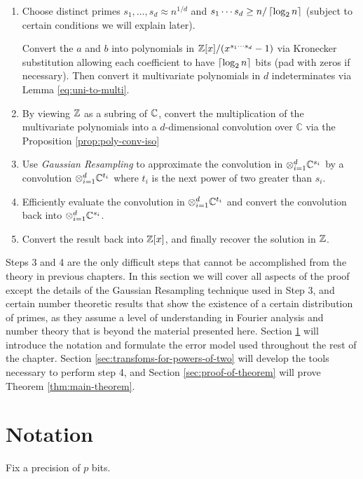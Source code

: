 \begin{enumerate}
    \item  Choose distinct primes $s_1, \ldots, s_d \approx n^{1/d}$ and $s_1\cdots s_d \ge n/\left \lceil \log_2 n \right \rceil$ (subject to certain conditions we will explain later).

        Convert the $a$ and $b$ into polynomials in ${\mathbb Z}[x]/(x^{s_1\cdots s_d} - 1)$ via Kronecker substitution allowing each coefficient to have $\left \lceil \log_2 n \right \rceil$ bits (pad with zeros if necessary). Then convert it multivariate polynomials in $d$ indeterminates via Lemma \ref{eq:uni-to-multi}.
    \item By viewing ${\mathbb Z}$ as a subring of ${\mathbb C}$, convert the multiplication of the multivariate polynomials into a $d$-dimensional convolution over $\mathbb{C}$ via the Proposition \ref{prop:poly-conv-iso}
    \item Use \emph{Gaussian Resampling} to approximate the convolution in $\otimes_{i=1}^d {\mathbb C}^{s_i}$ by a convolution $\otimes_{i=1}^d {\mathbb C}^{t_i}$ where $t_i$ is the next power of two greater than $s_i$.
    \item Efficiently evaluate the convolution in $\otimes_{i=1}^d {\mathbb C}^{t_i}$ and convert the convolution back into $\otimes_{i=1}^d {\mathbb C}^{s_i}$.
    \item Convert the result back into ${\mathbb Z}[x]$, and finally recover the solution in ${\mathbb Z}$.
\end{enumerate}

Steps 3 and 4 are the only difficult steps that cannot be accomplished from the theory in previous chapters. In this section we will cover all aspects of the proof except the details of the Gaussian Resampling technique used in Step 3, and certain number theoretic results that show the existence of a certain distribution of primes, as they assume a level of understanding in Fourier analysis and number theory that is beyond the material presented here. Section \ref{sec:notation} will introduce the notation and formulate the error model used throughout the rest of the chapter. Section \ref{sec:transfoms-for-powers-of-two} will develop the tools necessary to perform step 4, and Section \ref{sec:proof-of-theorem} will prove Theorem \ref{thm:main-theorem}.

\section{Notation}%
\label{sec:notation}

Fix a precision of $p$ bits.

